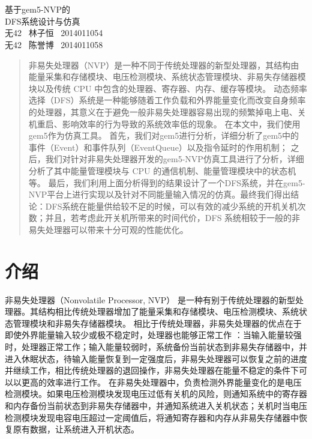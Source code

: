 \documentclass[a4paper,titlepage]{report}
\newcommand{\HUGE}{\fontsize{32pt}{32pt}\selectfont}
\begin{document}
\begin{titlepage}
\phantom{Start!}
\vspace{-1.7cm}
\begin{center}
  \emph{\Large }\\[1.0cm]
  \emph{\Large }\\[6.0cm]
  { \huge 基于gem5-NVP的}\\[0.5cm]
  { \HUGE DFS系统设计与仿真}\\[5.0cm]
  {无42 \  林子恒 \  2014011054}\\[0.2cm]
  {无42 \  陈誉博 \  2014011058} \\[0.2cm]
\end{center}
\vfill
\end{titlepage}

\renewcommand{\abstractname}{\HUGE 摘\quad 要}
\begin{abstract}
非易失处理器（NVP）是一种不同于传统处理器的新型处理器，其结构由能量采集和存储模块、电压检测模块、系统状态管理模块、非易失存储器模块以及传统 CPU 中包含的处理器、寄存器、内存、缓存等模块。
动态频率选择（DFS）系统是一种能够随着工作负载和外界能量变化而改变自身频率的处理器，其意义在于避免一般非易失处理器容易出现的频繁掉电上电、关机重启、影响效率的行为导致的系统效率低的现象。
在本文中，我们使用gem5作为仿真工具。
首先，我们对gem5进行分析，详细分析了gem5中的事件（Event）和事件队列（EventQueue）以及指令延时的作用机制；
之后，我们对针对非易失处理器开发的gem5-NVP仿真工具进行了分析，详细分析了其中能量管理模块与 CPU 的通信机制、能量管理模块中的状态机等。
最后，我们利用上面分析得到的结果设计了一个DFS系统，并在gem5-NVP平台上进行实现以及针对不同能量输入情况的仿真。最终我们得出结论：DFS系统在能量供给较不足的时候，可以有效的减少系统的开机关机次数；并且，若考虑此开关机所带来的时间代价，DFS 系统相较于一般的非易失处理器可以带来十分可观的性能优化。
\end{abstract}

\section{介绍}

非易失处理器（Nonvolatile Processor, NVP）\cite{liu2015ambient,zhao2016redesigning} 是一种有别于传统处理器的新型处理器。其结构相比传统处理器增加了能量采集和存储模块、电压检测模块、系统状态管理模块和非易失存储器模块。
相比于传统处理器，非易失处理器的优点在于即使外界能量输入较少或极不稳定时，处理器也能够正常工作 \cite{ma2015nonvolatile} ：当输入能量较强时，处理器正常工作；输入能量较弱时，系统备份当前状态到非易失存储器中，并进入休眠状态，待输入能量恢复到一定强度后，非易失处理器可以恢复之前的进度并继续工作，相比传统处理器的退回操作，非易失处理器在能量不稳定的条件下可以以更高的效率进行工作。
在非易失处理器中，负责检测外界能量变化的是电压检测模块。如果电压检测模块发现电压过低有关机的风险，则通知系统中的寄存器和内存备份当前状态到非易失存储器中，并通知系统进入关机状态；关机时当电压检测模块发现电容电压超过一定阈值后，将通知寄存器和内存从非易失存储器中恢复原有数据，让系统进入开机状态。
\end{document}
